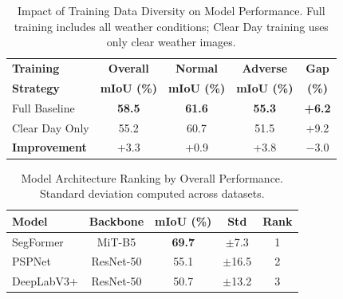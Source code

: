 \begin{table}[t]
\centering
\caption{Impact of Training Data Diversity on Model Performance. Full training includes all weather conditions; Clear Day training uses only clear weather images.}
\label{tab:training_comparison}
\begin{tabular}{@{}lcccc@{}}
\toprule
\textbf{Training} & \textbf{Overall} & \textbf{Normal} & \textbf{Adverse} & \textbf{Gap} \\
\textbf{Strategy} & \textbf{mIoU (\%)} & \textbf{mIoU (\%)} & \textbf{mIoU (\%)} & \textbf{(\%)} \\
\midrule
Full Baseline     & \textbf{58.5} & \textbf{61.6} & \textbf{55.3} & \textbf{+6.2} \\
Clear Day Only    & 55.2 & 60.7 & 51.5 & +9.2 \\
\midrule
\textbf{Improvement} & +3.3 & +0.9 & +3.8 & $-$3.0 \\
\bottomrule
\end{tabular}
\end{table}



\begin{table}[t]
\centering
\caption{Model Architecture Ranking by Overall Performance. Standard deviation computed across datasets.}
\label{tab:model_ranking}
\begin{tabular}{@{}lcccc@{}}
\toprule
\textbf{Model} & \textbf{Backbone} & \textbf{mIoU (\%)} & \textbf{Std} & \textbf{Rank} \\
\midrule
SegFormer  & MiT-B5  & \textbf{69.7} & $\pm$7.3  & 1 \\
PSPNet     & ResNet-50 & 55.1 & $\pm$16.5 & 2 \\
DeepLabV3+ & ResNet-50 & 50.7 & $\pm$13.2 & 3 \\
\bottomrule
\end{tabular}
\end{table}



